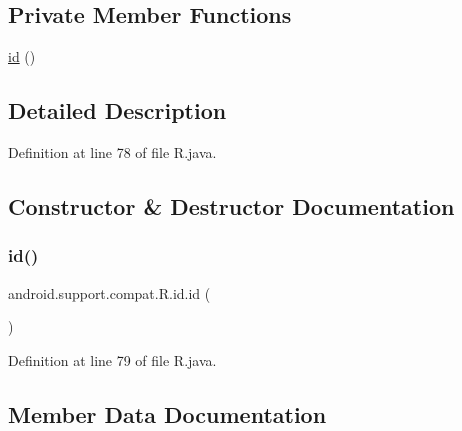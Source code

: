 \subsection*{Private Member Functions}
\begin{DoxyCompactItemize}
\item 
\mbox{\hyperlink{classandroid_1_1support_1_1compat_1_1_r_1_1id_aee040e2b824155ed725d5b50afb8f2ec}{id}} ()
\end{DoxyCompactItemize}


\subsection{Detailed Description}


Definition at line 78 of file R.\+java.



\subsection{Constructor \& Destructor Documentation}
\mbox{\label{classandroid_1_1support_1_1compat_1_1_r_1_1id_aee040e2b824155ed725d5b50afb8f2ec}} 
\subsubsection{\texorpdfstring{id()}{id()}}
{\footnotesize\ttfamily android.\+support.\+compat.\+R.\+id.\+id (\begin{DoxyParamCaption}{ }\end{DoxyParamCaption})\hspace{0.3cm}{\ttfamily [private]}}



Definition at line 79 of file R.\+java.


\begin{DoxyCode}{0}

\end{DoxyCode}


\subsection{Member Data Documentation}
\mbox{\label{classandroid_1_1support_1_1compat_1_1_r_1_1id_a7f80213ff3a91ef547ef997845e107fa}} 
